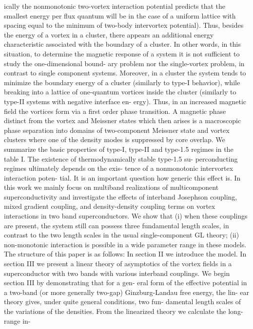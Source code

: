 ically the nonmonotonic two-vortex interaction potential
predicts that the smallest energy per flux quantum will
be in the case of a uniform lattice with spacing equal to
the minimum of two-body intervortex potential).
Thus, besides the energy of a vortex in a cluster, there
appears an additional energy characteristic associated
with the boundary of a cluster. In other words, in this
situation, to determine the magnetic response of a system
it is not sufficient to study the one-dimensional bound-
ary problem nor the single-vortex problem, in contrast
to single component systems. Moreover, in a cluster
the system tends to minimize the boundary energy of
a cluster (similarly to type-I behavior), while breaking
into a lattice of one-quantum vortices inside the cluster
(similarly to type-II systems with negative interface en-
ergy). Thus, in an increased magnetic field the vortices
form via a first order phase transition. A magnetic phase
distinct from the vortex and Meissner states which then
arises is a macroscopic phase separation into domains of
two-component Meissner state and vortex clusters where
one of the density modes is suppressed by core overlap.
We summarize the basic properties of type-I, type-II and
type-1.5 regimes in the table I.
The existence of thermodynamically stable type-1.5 su-
perconducting regimes ultimately depends on the exis-
tence of a nonmonotonic intervortex interaction poten-
tial. It is an important question how generic this effect is.
In this work we mainly focus on multiband realizations
of multicomponent superconductivity and investigate the
effects of interband Josephson coupling, mixed gradient
coupling, and density-density coupling terms on vortex
interactions in two band superconductors. We show that
(i) when these couplings are present, the system still can
possess three fundamental length scales, in contrast to
the two length scales in the usual single-component GL
theory; (ii) non-monotonic interaction is possible in a
wide parameter range in these models.
The structure of this paper is as follows: In section II
we introduce the model.
In section III we present a linear theory of asymptotics
of the vortex fields in a superconductor with two bands
with various interband couplings.
We begin section III by demonstrating that for a gen-
eral form of the effective potential in a two-band (or more
generally two-gap) Ginzburg-Landau free energy, the lin-
ear theory gives, under quite general conditions, two fun-
damental length scales of the variations of the densities.
From the linearized theory we calculate the long-range in-

